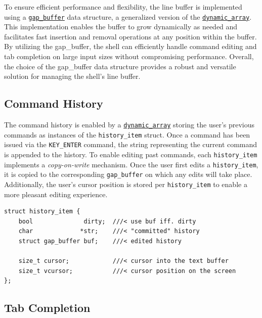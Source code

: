 To ensure efficient performance and flexibility, the line buffer is implemented using a  \href{https://en.wikipedia.org/wiki/Gap_buffer}{\texttt{gap\_buffer}} data structure, a generalized version of the \href{https://en.wikipedia.org/wiki/Dynamic_array}{\texttt{dynamic\_array}}. This implementation enables the buffer to grow dynamically as needed and facilitates fast insertion and removal operations at any position within the buffer. By utilizing the gap\_buffer, the shell can efficiently handle command editing and tab completion on large input sizes without compromising performance. Overall, the choice of the gap\_buffer data structure provides a robust and versatile solution for managing the shell's line buffer.


\subsection{Command History}\label{sec:shell_cmd_history}

The command history is enabled by a \href{https://en.wikipedia.org/wiki/Dynamic_array}{\texttt{dynamic\_array}} storing the user's previous commands as instances of the \texttt{history\_item} struct. Once a command has been issued via the \texttt{KEY\_ENTER} \keys{\return} command, the string representing the current command is appended to the history. To enable editing past commands, each \texttt{history\_item} implements a \emph{copy-on-write} mechanism. Once the user first edits a \texttt{history\_item}, it is copied to the corresponding \texttt{gap\_buffer} on which any edits will take place. Additionally, the user's cursor position is stored per \texttt{history\_item} to enable a more pleasant editing experience.

\begin{lstlisting}[caption={Shell: Enabling Command History via the \texttt{history\_item} struct},label={listing:shell_history_item}]
struct history_item {
    bool              dirty;  ///< use buf iff. dirty
    char             *str;    ///< "committed" history
    struct gap_buffer buf;    ///< edited history

    size_t cursor;            ///< cursor into the text buffer
    size_t vcursor;           ///< cursor position on the screen
};
\end{lstlisting}

\subsection{Tab Completion}\label{sec:shell_tab_completion}

